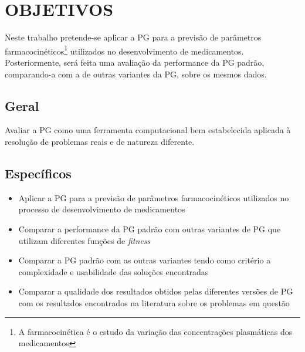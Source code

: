 \section{OBJETIVOS}
\label{sec:objetivos}

Neste trabalho pretende-se aplicar a \ac{PG}
para a previsão de parâmetros farmacocinéticos\footnote{A farmacocinética é o estudo da variação das concentrações plasmáticas dos medicamentos}  
utilizados no desenvolvimento de medicamentos. Posteriormente, será feita uma avaliação da performance da \ac{PG} padrão, comparando-a com a de outras
variantes da \ac{PG}, sobre os mesmos dados.

\subsection{Geral}
Avaliar a \ac{PG} como uma ferramenta computacional bem estabelecida aplicada à resolução de 
problemas reais e de natureza diferente.

\subsection{Específicos}
\begin{itemize}
  \item{Aplicar a \ac{PG} para a previsão de parâmetros farmacocinéticos utilizados no processo de desenvolvimento de medicamentos}
  \item{Comparar a performance da \ac{PG} padrão com outras variantes de \ac{PG} que utilizam diferentes funções de \emph{fitness}}
  \item{Comparar a \ac{PG} padrão com as outras variantes tendo como critério a complexidade e usabilidade das soluções encontradas}
  \item{Comparar a qualidade dos resultados obtidos pelas diferentes versões de \ac{PG} com os resultados encontrados na literatura sobre os problemas em questão}
\end{itemize}